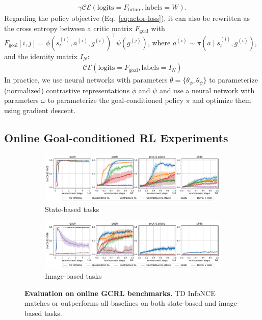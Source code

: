 \documentclass{article} %
\newcommand{\CE}{\mathcal{CE}}
\begin{document}
\begin{align}
    \gamma \CE(\text{logits} = F_{\text{future}}, \text{labels} = W).
    \label{eq:ce-negative}
\end{align}
Regarding the policy objective (Eq.~\ref{eq:actor-loss}), it can also be rewritten as the cross entropy between a critic matrix $F_{\text{goal}}$ with $F_{\text{goal}}[i, j] = \phi(s_t^{(i)}, {a}^{(i)}, g^{(i)})^{\top} \psi(g^{(j)})$, where $a^{(i)} \sim \pi(a \mid s_t^{(i)}, g^{(i)})$, and the identity matrix $I_N$:
\begin{align*}
    \CE(\text{logits} = F_{\text{goal}}, \text{labels} = I_N)
\end{align*}
In practice, we use neural networks with parameters $\theta = \{ \theta_{\phi}, \theta_{\psi} \}$ to parameterize (normalized) contrastive representations $\phi$ and $\psi$ and use a neural network with parameters $\omega$ to parameterize the goal-conditioned policy $\pi$ and optimize them using gradient descent.

\subsection{Online Goal-conditioned RL Experiments}

\begin{figure}[t]
    \centering
    \begin{subfigure}[c]{\textwidth}
    \centering
        \includegraphics[width=\linewidth]{figures/learning_curves/online_lc_state_v3.pdf}
        \caption{State-based tasks}
    \end{subfigure}
    \vfill
    \begin{subfigure}[c]{\textwidth}
        \centering
        \includegraphics[width=\linewidth]{figures/learning_curves/online_lc_image_v3.pdf}
        \caption{Image-based tasks}
    \end{subfigure}
    \caption{ \textbf{Evaluation on online GCRL benchmarks.} TD InfoNCE matches or outperforms all baselines on both state-based and image-based tasks.}
    \label{fig:online-eval}
\end{figure}
\end{document}
